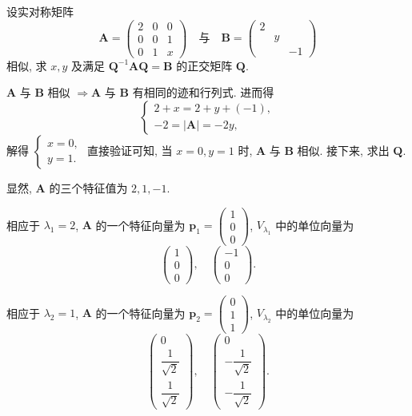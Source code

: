 \documentclass[../../main.tex]{subfiles}%
\begin{document}
\begin{example}
设实对称矩阵
\[
\boldsymbol{A} = \begin{pmatrix} 2 & 0 & 0 \\ 0 & 0 & 1 \\ 0 & 1 & x \end{pmatrix}
\quad \text{与} \quad 
\boldsymbol{B} = \begin{pmatrix} 2 &  &  \\  & y &  \\  &  & -1 \end{pmatrix}
\]
相似, 求 \( x,y \) 及满足 \( \boldsymbol{Q}^{-1}\boldsymbol{AQ} = \boldsymbol{B} \) 的正交矩阵 \( \boldsymbol{Q} \).
\end{example}
\begin{solution}

\( \boldsymbol{A} \) 与 \( \boldsymbol{B} \) 相似 \( \Rightarrow \boldsymbol{A} \) 与 \( \boldsymbol{B} \) 有相同的迹和行列式. 进而得
\[
\begin{cases}
2 + x = 2 + y + (-1), \\
-2 = |\boldsymbol{A}| = -2y,
\end{cases}
\]
解得 \( \begin{cases} x = 0, \\ y = 1. \end{cases} \) 直接验证可知, 当 \( x = 0, y = 1 \) 时, \( \boldsymbol{A} \) 与 \( \boldsymbol{B} \) 相似. 接下来, 求出 \( \boldsymbol{Q} \).

显然, \( \boldsymbol{A} \) 的三个特征值为 \( 2, 1, -1 \).

相应于 \( \lambda_1 = 2 \), \( \boldsymbol{A} \) 的一个特征向量为 \( \boldsymbol{p}_1 = \begin{pmatrix} 1 \\ 0 \\ 0 \end{pmatrix} \), \( V_{\lambda_1} \) 中的单位向量为
\[
\begin{pmatrix} 1 \\ 0 \\ 0 \end{pmatrix}, \quad \begin{pmatrix} -1 \\ 0 \\ 0 \end{pmatrix}.
\]

相应于 \( \lambda_2 = 1 \), \( \boldsymbol{A} \) 的一个特征向量为 \( \boldsymbol{p}_2 = \begin{pmatrix} 0 \\ 1 \\ 1 \end{pmatrix} \), \( V_{\lambda_2} \) 中的单位向量为
\[
\begin{pmatrix} 0 \\ \dfrac{1}{\sqrt{2}} \\ \dfrac{1}{\sqrt{2}} \end{pmatrix}, \quad \begin{pmatrix} 0 \\ -\dfrac{1}{\sqrt{2}} \\ -\dfrac{1}{\sqrt{2}} \end{pmatrix}.
\]


\end{solution}
\end{document}
